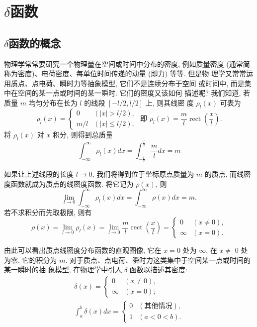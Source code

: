 \section{\texorpdfstring{$\delta$}{delta}函数}
\label{sub:delta_function}

\subsection{\texorpdfstring{$\delta$}{delta}函数的概念}

物理学常常要研究一个物理量在空间或时间中分布的密度, 例如质量密度 (通常简称为密度)、电荷密度、每单位时间传递的动量 (即力) 等等. 但是物 理学又常常运用质点、点电荷、瞬时力等抽象模型, 它们不是连续分布于空间 或时间中, 而是集中在空间的某一点或时间的某一瞬时. 它们的密度又该如何 描述呢?
我们知道, 若质量 $m$ 均匀分布在长为 $l$ 的线段 $[-l / 2, l / 2]$ 上, 则其线密 度 $\rho_l(x)$ 可表为
$$
\rho_l(x)=\left\{\begin{array}{ll}
0 & (|x|>l / 2), \\
m / l & (|x| \leqslant l / 2),
\end{array} \text { 即 } \rho_l(x)=\frac{m}{l} \operatorname{rect}\left(\frac{x}{l}\right) .\right.
$$
将 $\rho_l(x)$ 对 $x$ 积分, 则得到总质量
$$
\int_{-\infty}^{\infty} \rho_l(x) d x=\int_{-\frac{l}{2}}^{\frac{l}{2}} \frac{m}{l} d x=m
$$

如果让上述线段的长度 $l \rightarrow 0$, 我们将得到位于坐标原点质量为 $m$ 的质点, 而线密度函数就成为质点的线密度函数. 将它记为 $\rho(x)$, 则
$$
\lim _{l \rightarrow 0} \int_{-\infty}^{\infty} \rho_l(x) d x=\int_{-\infty}^{\infty} \rho(x) d x=m .
$$
若不求积分而先取极限, 则有
$$
\rho(x)=\lim _{l \rightarrow 0} \rho_l(x)=\lim _{l \rightarrow 0} \frac{m}{l} \operatorname{rect}\left(\frac{x}{l}\right)= \begin{cases}0 & (x \neq 0), \\ \infty & (x=0) .\end{cases}
$$

由此可以看出质点线密度分布函数的直观图像, 它在 $x=0$ 处为 $\infty$, 在 $x \neq$ 0 处为零. 它的积分为 $m$.
对于质点、点电荷、瞬时力这类集中于空间某一点或时间的某一瞬时的抽 象模型, 在物理学中引人 $\delta$ 函数以描述其密度:
$$
\begin{gathered}
\delta(x)= \begin{cases}0 & (x \neq 0), \\
\infty & (x=0) ;\end{cases} \\
\int_a^b \delta(x) d x= \begin{cases}0 & (\text{其他情况}), \\
1 & (a<0<b) .\end{cases}
\end{gathered}
$$

